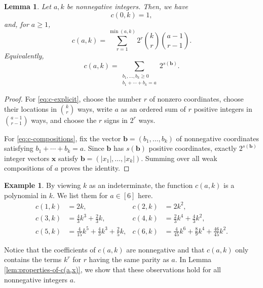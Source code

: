 \documentclass[11pt,a4paper]{article}
\newcommand{\vct}[1]{\boldsymbol{#1}}
\newcommand{\1}{\mathbf{1}}
\theoremstyle{plain}
\newtheorem{lemma}[theorem]{Lemma}
\theoremstyle{definition}
\newtheorem{example}[theorem]{Example}
\begin{document}
\begin{lemma}\label{lem:explicit-c(a,k)} Let $a,k$ be nonnegative integers. Then, we have
\[
c(0,k)=1,
\]
and, for $a\ge1$,
\begin{equation}
c(a,k)=\sum_{r=1}^{\min(a,k)}2^r\binom{k}{r}\binom{a-1}{r-1}.
\label{eq:c-explicit}
\end{equation}
Equivalently,
\begin{equation}
c(a,k)=\sum_{\substack{b_1,\ldots,b_k\ge0\\b_1+\cdots+b_k=a}}2^{s(\vct{b})}.
\label{eq:c-compositions}
\end{equation}
\end{lemma}
\begin{proof}
For \eqref{eq:c-explicit}, choose the number $r$ of nonzero coordinates, choose their locations in $\binom{k}{r}$ ways, write $a$ as an ordered sum of $r$ positive integers in $\binom{a-1}{r-1}$ ways, and choose the $r$ signs in $2^r$ ways.

For \eqref{eq:c-compositions}, fix the vector $\vct{b} = (b_1,\dots, b_k)$ of nonnegative coordinates satisfying $b_1+\cdots + b_k = a.$ Since $\vct{b}$ has $s(\vct{b})$ positive coordinates, exactly $2^{s(\vct{b})}$ integer vectors $\vct{x}$ satisfy $\vct{b} = (|x_1|,\dots, |x_k|)$. Summing over all weak compositions of $a$ proves the identity.
\end{proof}

\begin{example}
By viewing $k$ as an indeterminate, the function $c(a,k)$ is a polynomial in $k$. We list them for $a \in [6]$ here.
\begin{align*}
c(1,k) &= 2k, &
c(2,k) &= 2k^2,\\
c(3,k) &= \frac{4}{3}k^3+\frac{2}{3}k, & 
c(4,k) &= \frac{2}{3}k^4+\frac{4}{3}k^2,\\
c(5,k) &= \frac{4}{15}k^5+\frac{4}{3}k^3+\frac{2}{5}k, &
c(6,k) &= \frac{4}{45}k^6+\frac{8}{9}k^4+\frac{46}{45}k^2.
\end{align*}

 Notice that the coefficients of $c(a,k)$ are nonnegative and that $c(a,k)$ only contains the terms $k^r$ for $r$ having the same parity as $a.$ In Lemma \ref{lem:properties-of-c(a,x)}, we show that these observations hold for all nonnegative integers $a.$
\end{example}
\end{document}
